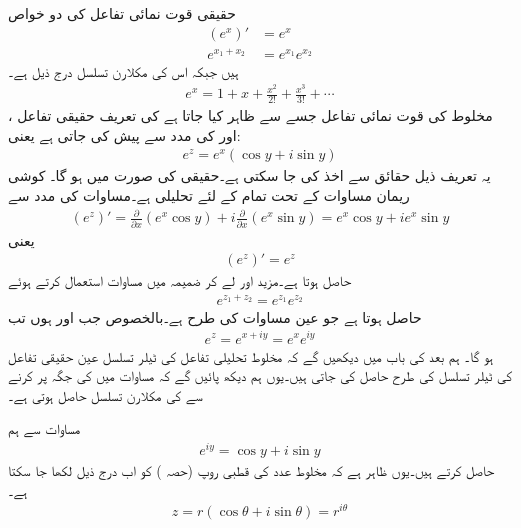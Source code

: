 حقیقی قوت نمائی تفاعل  کی دو خواص
\begin{align}
(e^x)'&=e^x\label{مساوات_مخلوط_قوت_نمائی_حقیقی_الف}\\
e^{x_1+x_2}&=e^{x_1}e^{x_2}\label{مساوات_مخلوط_قوت_نمائی_حقیقی_ب}
\end{align}
ہیں جبکہ اس کی مکلارن تسلسل درج ذیل ہے۔
\begin{align}
e^x=1+x+\frac{x^2}{2!}+\frac{x^3}{3!}+\cdots\label{مساوات_مخلوط_قوت_نمائی_حقیقی_پ}
\end{align}
مخلوط  کی قوت نمائی تفاعل جسے  سے ظاہر کیا جاتا ہے کی تعریف حقیقی تفاعل ،  اور  کی مدد سے پیش کی جاتی ہے یعنی:
\begin{align}\label{مساوات_مخلوط_قوت_نمائی_تعریف_الف}
e^z=e^x(\cos y+i\sin y)
\end{align} 
یہ تعریف ذیل حقائق سے اخذ کی جا سکتی ہے۔حقیقی  کی صورت میں  ہو گا۔ کوشی ریمان مساوات کے تحت  تمام  کے لئے تحلیلی ہے۔مساوات  کی مدد سے
\begin{align*}
(e^z)'=\frac{\partial}{\partial x}(e^x\cos y)+i\frac{\partial}{\partial x}(e^x\sin y)=e^x\cos y+ie^x\sin y
\end{align*}
یعنی
\begin{align}\label{مساوات_مخلوط_قوت_نمائی_تعریف_ب}
(e^z)'=e^z
\end{align}
حاصل ہوتا ہے۔مزید  اور  لے کر  ضمیمہ  میں مساوات  استعمال کرتے ہوئے
\begin{align}\label{مساوات_مخلوط_قوت_نمائی_تعریف_پ}
e^{z_1+z_2}=e^{z_1}e^{z_2}
\end{align}
حاصل ہوتا ہے جو عین مساوات  کی طرح ہے۔بالخصوص جب  اور  ہوں تب
\begin{align}\label{مساوات_مخلوط_قوت_نمائی_تعریف_ت}
e^z=e^{x+iy}=e^xe^{iy}
\end{align}
ہو گا۔ ہم بعد کی باب میں دیکھیں گے کہ مخلوط تحلیلی تفاعل کی ٹیلر تسلسل عین حقیقی تفاعل کی ٹیلر تسلسل کی طرح حاصل کی جاتی ہیں۔یوں ہم دیکھ پائیں گے کہ مساوات  میں  کی جگہ  پر کرنے سے  کی مکلارن تسلسل حاصل ہوتی ہے۔

مساوات  سے ہم 
\begin{align}\label{مساوات_مخلوط_قوت_نمائی_تعریف_ٹ}
e^{iy}=\cos y+i\sin y
\end{align} 
حاصل کرتے ہیں۔یوں ظاہر  ہے کہ مخلوط عدد  کی قطبی روپ (حصہ ) کو اب درج ذیل لکھا جا سکتا ہے۔
\begin{align}\label{مساوات_مخلوط_قوت_نمائی_تعریف_ث}
z=r(\cos \theta+i\sin \theta)=r^{i\theta}
\end{align}

